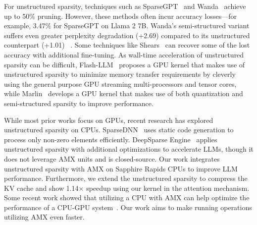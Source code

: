 For unstructured sparsity, techniques such as SparseGPT~\cite{frantar2023sparsegpt} and Wanda~\cite{sunsimple} achieve up to 50\% pruning. However, these methods often incur accuracy losses—for example, 3.47\% for SparseGPT on Llama 2 7B. Wanda’s semi-structured variant suffers even greater perplexity degradation (+2.69) compared to its unstructured counterpart (+1.01) ~\cite{zhu2023survey}. Some techniques like Shears~\cite{munoz2024shears} can recover some of the lost accuracy with additional fine-tuning.
As wall-time acceleration of unstructured sparsity can be difficult, Flash-LLM~\cite{xia2023flash} proposes a GPU kernel that makes use of unstructured sparsity to minimize memory transfer requirements by cleverly using the general purpose GPU streaming multi-processors and tensor cores, while Marlin~\cite{frantar2024marlin} develops a GPU kernel that makes use of both quantization and semi-structured sparsity to improve performance.


While most prior works focus on GPUs, recent research has explored unstructured sparsity on CPUs. SparseDNN~\cite{wang2021sparsednn} uses static code generation to process only non-zero elements efficiently. DeepSparse Engine~\cite{deepsparse} applies unstructured sparsity with additional optimizations to accelerate LLMs, though it does not leverage AMX units and is closed-source. Our work integrates unstructured sparsity with AMX on Sapphire Rapids CPUs to improve LLM performance. Furthermore, we extend the unstructured sparsity to compress the KV cache and show 1.14$\times$ speedup using our kernel in the attention mechanism.
Some recent work showed that utilizing a CPU with AMX can help optimize the performance of a CPU-GPU system~\cite{10538369}. Our work aims to make running operations utilizing AMX even faster.